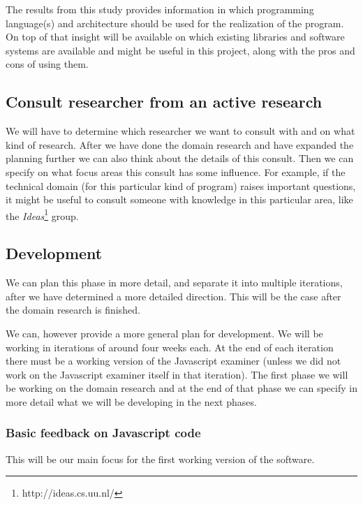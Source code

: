 \documentclass{article}
\begin{document}
The results from this study provides information in which programming
language(s) and architecture should be used for the realization of the
program. On top of that insight will be available on which existing libraries
and software systems are available and might be useful in this project, along
with the pros and cons of using them.

\subsection{Consult researcher from an active research}
We will have to determine which researcher we want to consult with and on what
kind of research. After we have done the domain research and have expanded the
planning further we can also think about the details of this consult. Then we
can specify on what focus areas this consult has some influence. For example,
if the technical domain (for this particular kind of program) raises important
questions, it might be useful to consult someone with knowledge in this
particular area, like the {\em Ideas}\footnote{http://ideas.cs.uu.nl/} group.

\subsection{Development} 

We can plan this phase in more detail, and separate it into multiple iterations,
after we have determined a more detailed direction. This will be the case after
the domain research is finished.

We can, however provide a more general plan for development. We will be working 
in iterations of around four weeks each. At the end of each iteration there must 
be a working version of the Javascript examiner (unless we did not work on the 
Javascript examiner itself in that iteration). The first phase we will be 
working on the domain research and at the end of that phase we can specify in 
more detail what we will be developing in the next phases. 

\subsubsection{Basic feedback on Javascript code} This will be 
our main focus for the first working version of the software. 
\end{document}
